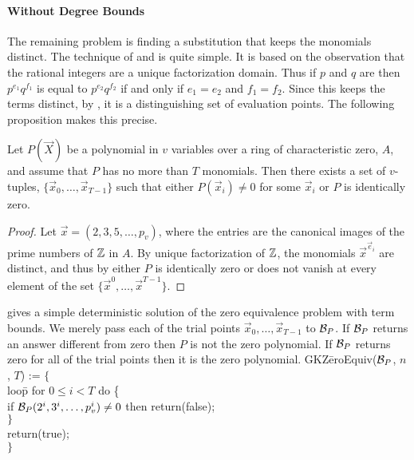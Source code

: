 \paragraph{Without Degree Bounds}

The remaining problem is finding a substitution that keeps the
monomials distinct.  The technique of {\Grigoriev} and {\Karpinski} is
quite simple.  It is based on the observation that the rational
integers are a unique factorization domain. Thus if $p$ and $q$ are
 then $p^{e_1} q^{f_1}$ is equal to $p^{e_2} q^{f_2}$ if 
and only if $e_1= e_2$ and $f_1 = f_2$.  Since this keeps the terms 
distinct, by , it is a distinguishing set of 
evaluation points.  The following proposition makes this precise.

\begin{proposition}
\label{Deterministic:Zero:Prop}
Let $P(\vec{X})$ be a polynomial in $v$ variables over a ring of
characteristic zero, $A$, and assume that $P$ has no more than $T$
monomials.  Then there exists a set of $v$-tuples, $\{\vec{x}_0,
\ldots,
\vec{x}_{T-1}\}$ such that either $P(\vec{x}_i) \not= 0$ for some 
$\vec{x}_i$ or $P$ is identically zero.
\end{proposition}

\begin{proof}
Let $\vec{x} = (2, 3, 5, \ldots, p_v)$, where the entries are the 
canonical images of the prime numbers of $\mathbb{Z}$ in $A$.  By unique 
factorization of $\mathbb{Z}$, the monomials $\vec{x}^{\vec{e}_i}$ are distinct, 
and thus by  either $P$ is identically zero or 
does not vanish at every element of the set $\{\vec{x}^0, \ldots,
\vec{x}^{T-1}\}$.
\end{proof} 

 gives a simple deterministic
solution of the zero equivalence problem with term bounds.  We merely
pass each of the trial points $\vec{x}_0, \ldots, \vec{x}_{T-1}$ to ${\cal
B}_P$. If ${\cal B}_P$ returns an answer different from zero then $P$
is not the zero polynomial.  If ${\cal B}_P$ returns zero for all of
the trial points then it is the zero polynomial.
\begindsacode
GKZ\=eroEquiv(${\cal B}_P$, $n$, $T$) := $\{$\\
\> loo\=p for $0 \le i < T$ do \{ \\
\>\> if ${\cal B}_P(2^i, 3^i, \ldots, p_v^i) \not=0$ then return(false); \\
\>\> $\}$\\
\> return(true);\\
\> $\}$
\enddsacode

